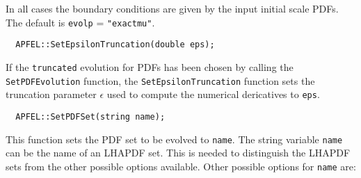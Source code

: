 \documentclass[11pt,a4paper]{article}
\begin{document}
In all cases the boundary conditions are given by the input initial
scale PDFs. The default is {\tt evolp} = {\tt "exactmu"}.
\begin{lstlisting}
  APFEL::SetEpsilonTruncation(double eps);
\end{lstlisting}
If the {\tt truncated} evolution for PDFs has been chosen by calling
the {\tt SetPDFEvolution} function, the {\tt SetEpsilonTruncation}
function sets the truncation parameter $\epsilon$ used to compute the
numerical dericatives to {\tt eps}.
\begin{lstlisting}
  APFEL::SetPDFSet(string name);
\end{lstlisting}
This function sets the PDF set to be evolved to {\tt name}. The
string variable {\tt name} can be the name of an LHAPDF set. This is
needed to distinguish the LHAPDF sets from the other possible options
available. Other possible options for {\tt name} are:
\end{document}
